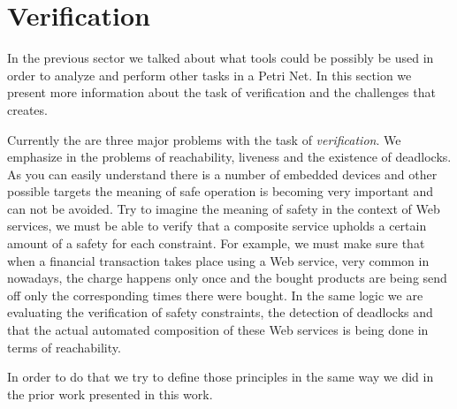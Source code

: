 \section*{Verification}
In the previous sector we talked about what tools could be possibly be used in order to analyze and perform other tasks in a Petri Net. In this section we present more information about the task of verification and the challenges that creates.

Currently the are three major problems with the task of \emph{verification}. We emphasize in the problems of reachability, liveness and the existence of deadlocks. As you can easily understand there is a number of embedded devices and other possible targets the meaning of safe operation is becoming very important and can not be avoided. Try to imagine the meaning of safety in the context of Web services, we must be able to verify that a composite service upholds a certain amount of a safety for each constraint. For example, we must make sure that when a financial transaction takes place using a Web service, very common in nowadays, the charge happens only once and the bought products are being send off only the corresponding times there were bought. In the same logic we are evaluating the verification of safety constraints, the detection of deadlocks and that the actual automated composition of these Web services is being done in terms of reachability.

In order to do that we try to define those principles in the same way we did in the prior work presented in this work.

